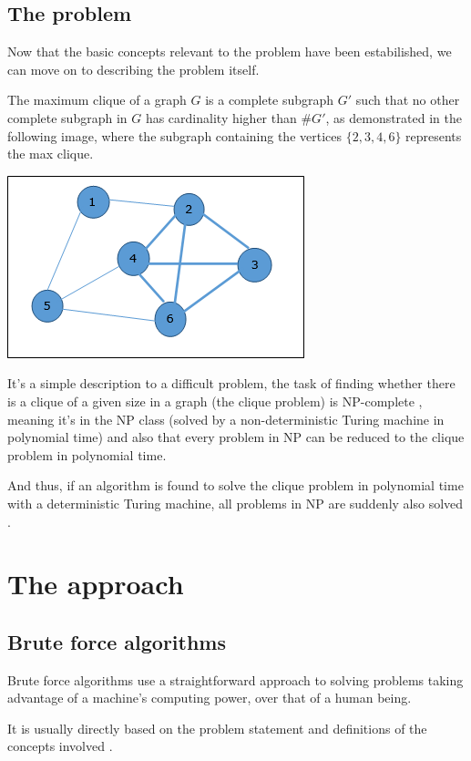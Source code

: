 \documentclass[...]{revdetua}
\begin{document}
\subsection{The problem}
Now that the basic concepts relevant to the problem have been estabilished, we can move on to describing the problem itself.\par
The maximum clique of a graph $G$ is a complete subgraph $G'$ such that no other complete subgraph in $G$ has cardinality higher than $\#G'$, as demonstrated in the following image, where the subgraph containing the vertices ${\{2,3,4,6\}}$ represents the max clique.\par
\begin{center}
\includegraphics[scale=0.8]{max_clique_example}
\end{center}
\label{Example of a max clique of a graph}
It's a simple description to a difficult problem, the task of finding whether there is a clique of a given size in a graph (the clique problem) is NP-complete \cite{wikiclique}, meaning it's in the NP class (solved by a non-deterministic Turing machine in polynomial time) and also that every problem in NP can be reduced to the clique problem in polynomial time.\par 
And thus, if an algorithm is found to solve the clique problem in polynomial time with a deterministic Turing machine, all problems in NP are suddenly also solved \cite{wikinp}. 
\section{The approach}
\subsection{Brute force algorithms}
Brute force algorithms use a straightforward approach to solving problems taking advantage of a machine's computing power, over that of a human being.\par
It is usually directly based on the problem statement and definitions of the concepts involved \cite{brute}. 
\end{document}

